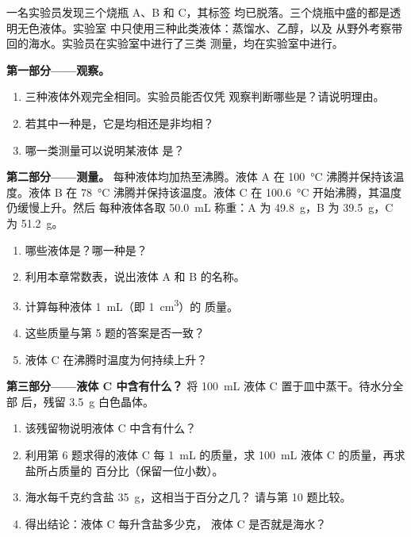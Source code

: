 \begin{problem}
\label{pb:g6:pure-substances-and-mixtures:1}
一名实验员发现三个烧瓶 A、B 和 C，其标签
均已脱落。三个烧瓶中盛的都是透明无色液体。实验室
中只使用三种此类液体：蒸馏水、乙醇，以及
从野外考察带回的海水。实验员在实验室中进行了三类
测量，均在实验室中进行。

\medskip
\noindent\textbf{第一部分——观察。}
\begin{enumerate}
  \item 三种液体外观完全相同。实验员能否仅凭
        观察判断哪些是？请说明理由。
  \item 若其中一种是，它是均相还是非均相？
  \item 哪一类测量可以说明某液体
        是？
\end{enumerate}

\medskip
\noindent\textbf{第二部分——测量。}
每种液体均加热至沸腾。液体 A 在
\qty{100}{\celsius} 沸腾并保持该温度。液体 B 在
\qty{78}{\celsius} 沸腾并保持该温度。液体 C 在
\qty{100.6}{\celsius} 开始沸腾，其温度仍缓慢上升。然后
每种液体各取 \qty{50.0}{mL} 称重：A 为
\qty{49.8}{g}，B 为 \qty{39.5}{g}，C 为 \qty{51.2}{g}。
\begin{enumerate}[resume]
  \item 哪些液体是？哪一种是？
  \item 利用本章常数表，说出液体 A 和
        B 的名称。
  \item 计算每种液体 \qty{1}{mL}（即 \qty{1}{cm^3}）的
        质量。
  \item 这些质量与第 5 题的答案是否一致？
  \item 液体 C 在沸腾时温度为何持续上升？
\end{enumerate}

\medskip
\noindent\textbf{第三部分——液体 C 中含有什么？}
将 \qty{100}{mL} 液体 C 置于皿中蒸干。待水分全部
后，残留 \qty{3.5}{g} 白色晶体。
\begin{enumerate}[resume]
  \item 该残留物说明液体 C 中含有什么？
  \item 利用第 6 题求得的液体 C 每 \qty{1}{mL} 的质量，求
        \qty{100}{mL} 液体 C 的质量，再求盐所占质量的
        百分比（保留一位小数）。
  \item 海水每千克约含盐 \qty{35}{g}，这相当于百分之几？
        请与第 10 题比较。
  \item 得出结论：液体 C 每升含盐多少克，
        液体 C 是否就是海水？
\end{enumerate}
\end{problem}
